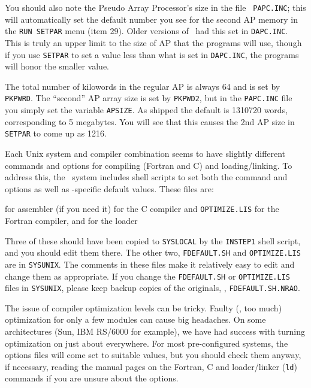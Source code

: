 You should also note the Pseudo Array Processor's size in the file {\tt
PAPC.INC}; this will automatically set the default number you see for
the second AP memory in the {\tt RUN SETPAR} menu (item 29).  Older
versions of \AIPS\ had this set in {\tt DAPC.INC}.  This is truly an
upper limit to the size of AP that the programs will use, though if you
use {\tt SETPAR} to set a value less than what is set in {\tt DAPC.INC},
the programs will honor the smaller value.

The total number of kilowords in the regular AP is always 64 and is set
by {\tt PKPWRD}.  The ``second'' AP array size is set by {\tt PKPWD2},
but in the {\tt PAPC.INC} file you simply set the variable {\tt APSIZE}.
As shipped the default is 1310720 words, corresponding to 5 megabytes.
You will see that this causes the 2nd AP size in {\tt SETPAR} to come up
as 1216.
\medskip


Each Unix system and compiler combination seems to have slightly different
commands and options for compiling (Fortran and C) and loading/linking.
To address this, the \AIPS\ system includes shell scripts to set both the
command and options as well as \aips-specific default values.  These files
are:\medskip

{ for assembler (if you need it)}
{ for the C compiler}
{ and {\tt OPTIMIZE.LIS} for the Fortran
        compiler, and}
{ for the loader\medskip}\medskip

\noindent Three of these should have been copied to {\tt\dol SYSLOCAL} by
the {\tt INSTEP1} shell script, and you should edit them there.  The
other two, {\tt FDEFAULT.SH} and {\tt OPTIMIZE.LIS} are in
{\tt\dol SYSUNIX}.  The comments in these files make it relatively easy to
edit and change them as appropriate.  If you change the {\tt FDEFAULT.SH}
or {\tt OPTIMIZE.LIS} files in {\tt\dol SYSUNIX}, please keep backup
copies of the originals, \eg, {\tt FDEFAULT.SH.NRAO}.

The issue of compiler optimization levels can be tricky.  Faulty (\ie,
too much) optimization for only a few modules can cause big headaches.
On some architectures (Sun, IBM RS/6000 for example), we have had
success with turning optimization on just about everywhere.  For most
pre-configured systems, the options files will come set to suitable
values, but you should check them anyway, if necessary, reading the
manual pages on the Fortran, C and loader/linker ({\tt ld}) commands if
you are unsure about the options.

